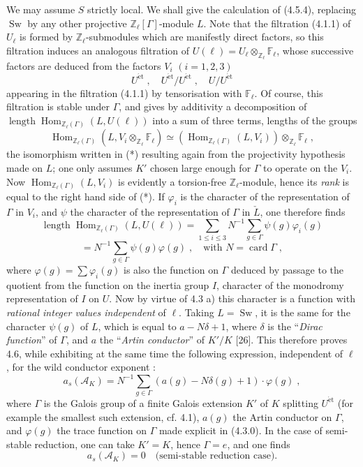 \documentclass[11pt]{article}
\newcommand{\Hom}{\operatorname{Hom}}
\newcommand{\ZZ}{\mathbb Z}
\newcommand{\FF}{\mathbb F}
\newcommand{\sA}{\mathscr A}
\newcommand{\longueur}{\operatorname{length}}
\newcommand{\et}{\mathrm{\acute{e}t}}
\newcommand{\card}{\operatorname{card}}
\begin{document}
We may assume $S$ strictly local. We shall give the calculation of
(4.5.4), replacing $\operatorname{Sw}$ by any other projective
$\ZZ_{\ell}[\Gamma]$-module $L$. Note that the filtration (4.1.1) of
$U_{\ell}$ is formed by $\ZZ_{\ell}$-submodules which are manifestly
direct factors, so this filtration induces an analogous filtration of
$U(\ell) = U_{\ell} \otimes_{\ZZ_{\ell}} \FF_{\ell}$, whose successive
factors are deduced from the factors $V_i$ $(i = 1, 2, 3)$
\[
U^{\et} \; , \quad U^{\et}/U^{\et} \; , \quad U/U^{\et}
\]
appearing in the filtration (4.1.1) by tensorisation with $\FF_{\ell}$.
Of course, this filtration is stable under $\Gamma$, and gives by
additivity a decomposition of
$\longueur \Hom_{\ZZ_{\ell}(\Gamma)}(L, U(\ell))$ into a sum of three
terms, lengths of the groups
\begin{equation}
\Hom_{\ZZ_{\ell}(\Gamma)}(L, V_i \otimes_{\ZZ_{\ell}} \FF_{\ell})
\simeq (\Hom_{\ZZ_{\ell}(\Gamma)}(L, V_i)) \otimes_{\ZZ_{\ell}}
\FF_{\ell} \; ,
\end{equation}
the isomorphism written in (*) resulting again from the projectivity
hypothesis made on $L$; one only assumes $K'$ chosen large enough for
$\Gamma$ to operate on the $V_i$. Now
$\Hom_{\ZZ_{\ell}(\Gamma)}(L, V_i)$ is evidently a torsion-free
$\ZZ_{\ell}$-module, hence its \emph{rank} is equal to the right hand
side of (*). If $\varphi_i$ is the character of the representation of
$\Gamma$ in $V_i$, and $\psi$ the character of the representation of
$\Gamma$ in $\check{L}$, one therefore finds
\begin{equation}
\longueur \Hom_{\ZZ_{\ell}(\Gamma)}(L, U(\ell)) = \sum_{1 \leq i
\leq 3} N^{-1} \sum_{g \in \Gamma} \psi(g) \varphi_i(g)
\end{equation}
\[
= N^{-1} \sum_{g \in \Gamma} \psi(g) \varphi(g) \; , \quad
\text{with } N = \card \Gamma \; ,
\]
where $\varphi(g) = \sum \varphi_i(g)$ is also the function on $\Gamma$
deduced by passage to the quotient from the function on the inertia
group $I$, character of the monodromy representation of $I$ on $U$. Now
by virtue of 4.3 a) this character is a function with \emph{rational
integer values independent} of $\ell$. Taking $L = \operatorname{Sw}$,
it is the same for the character $\psi(g)$ of $L$, which is equal to
$a - N\delta + 1$, where $\delta$ is the ``\emph{Dirac function}'' of
$\Gamma$, and $a$ the ``\emph{Artin conductor}'' of $K'/K$ [26]. This
therefore proves 4.6, while exhibiting at the same time the following
expression, independent of $\ell$, for the wild conductor exponent :
\begin{equation}
a_s(\sA_K) = N^{-1} \sum_{g \in \Gamma} (a(g) - N\delta(g) + 1) \cdot
\varphi(g) \; ,
\end{equation}
where $\Gamma$ is the Galois group of a finite Galois extension $K'$ of
$K$ splitting $U^{\et}$ (for example the smallest such extension, cf.
4.1), $a(g)$ the Artin conductor on $\Gamma$, and $\varphi(g)$ the trace
function on $\Gamma$ made explicit in (4.3.0). In the case of
semi-stable reduction, one can take $K' = K$, hence $\Gamma = e$, and one
finds
\begin{equation}
a_s(\sA_K) = 0 \quad \text{(semi-stable reduction case).}
\end{equation}
\end{document}
